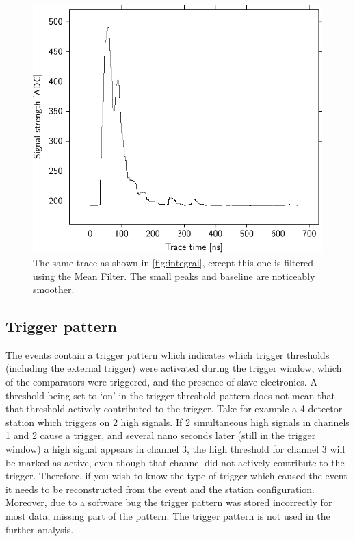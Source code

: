 \begin{figure}
    \centering
    \includegraphics[width=0.7\linewidth]{plots/processing/mean_filter}
    \caption{The same trace as shown in \cref{fig:integral}, except this one is filtered using the Mean Filter. The small peaks and baseline are noticeably smoother.}
    \label{fig:mean_filter}
\end{figure}


\subsection{Trigger pattern}

The \hisparc events contain a trigger pattern which indicates which trigger thresholds (including the external trigger) were activated during the trigger window, which of the comparators were triggered, and the presence of slave electronics. A threshold being set to `on' in the trigger threshold pattern does not mean that that threshold actively contributed to the trigger. Take for example a 4-detector station which triggers on 2 high signals. If 2 simultaneous high signals in channels 1 and 2 cause a trigger, and several nano seconds later (still in the trigger window) a high signal appears in channel 3, the high threshold for channel 3 will be marked as active, even though that channel did not actively contribute to the trigger. Therefore, if you wish to know the type of trigger which caused the event it needs to be reconstructed from the event and the station configuration. Moreover, due to a software bug the trigger pattern was stored incorrectly for most data, missing part of the pattern. The trigger pattern is not used in the further analysis.


